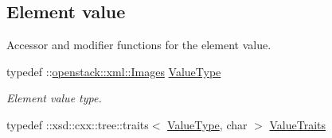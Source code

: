 \subsection*{Element value}
\label{_amgrp2ee2eae1a8c390ea033f241c027da8d6}
Accessor and modifier functions for the element value. \begin{DoxyCompactItemize}
\item 
\hypertarget{classopenstack_1_1xml_1_1Images___a77bfee09a2aa3e1efc0cd3721bf9847e}{
typedef ::\hyperlink{classopenstack_1_1xml_1_1Images}{openstack::xml::Images} \hyperlink{classopenstack_1_1xml_1_1Images___a77bfee09a2aa3e1efc0cd3721bf9847e}{ValueType}}
\label{classopenstack_1_1xml_1_1Images___a77bfee09a2aa3e1efc0cd3721bf9847e}

\begin{DoxyCompactList}\small\item\em Element value type. \item\end{DoxyCompactList}\item 
\hypertarget{classopenstack_1_1xml_1_1Images___a0a8b44039b2ce79890cb75f07ee8b8fb}{
typedef ::xsd::cxx::tree::traits$<$ \hyperlink{classopenstack_1_1xml_1_1Images}{ValueType}, char $>$ \hyperlink{classopenstack_1_1xml_1_1Images___a0a8b44039b2ce79890cb75f07ee8b8fb}{ValueTraits}}
\label{classopenstack_1_1xml_1_1Images___a0a8b44039b2ce79890cb75f07ee8b8fb}


\end{DoxyCompactItemize}
